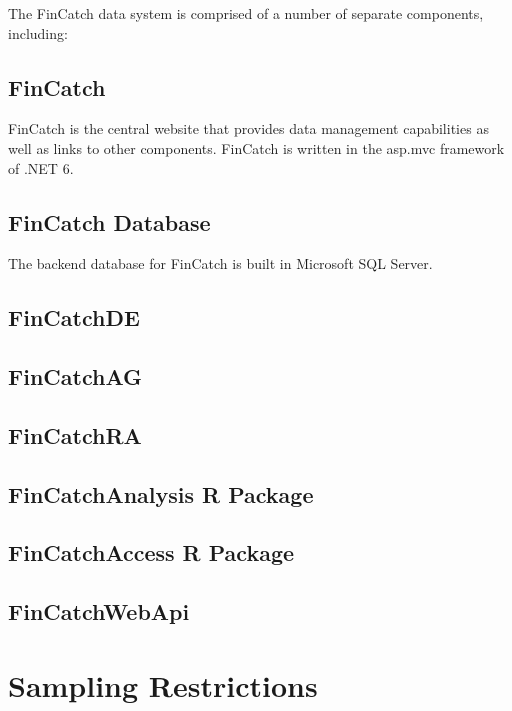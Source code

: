 \documentclass[
  letterpaper,
  DIV=11,
  numbers=noendperiod]{scrreprt}
\begin{document}
The FinCatch data system is comprised of a number of separate
components, including:

\section{FinCatch}\label{fincatch}

FinCatch is the central website that provides data management
capabilities as well as links to other components. FinCatch is written
in the asp.mvc framework of .NET 6.

\section{FinCatch Database}\label{fincatch-database}

The backend database for FinCatch is built in Microsoft SQL Server.

\section{FinCatchDE}\label{fincatchde}

\section{FinCatchAG}\label{fincatchag}

\section{FinCatchRA}\label{fincatchra}

\section{FinCatchAnalysis R Package}\label{fincatchanalysis-r-package}

\section{FinCatchAccess R Package}\label{fincatchaccess-r-package}

\section{FinCatchWebApi}\label{fincatchwebapi}

\chapter{Sampling Restrictions}\label{sampling-restrictions}
\end{document}
